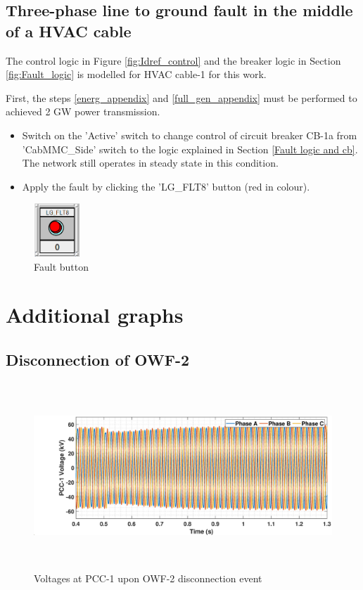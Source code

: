 \subsection{Three-phase line to ground fault in the middle of a HVAC cable}
The control logic in Figure \ref{fig:Idref_control} and the breaker logic in Section \ref{fig:Fault_logic} is modelled for \gls{HVAC} cable-1 for this work. 

First, the steps \ref{energ_appendix} and \ref{full_gen_appendix} must be performed to achieved 2 GW power transmission.

\begin{itemize}
    \item Switch on the 'Active' switch  to change control of circuit breaker CB-1a from 'CabMMC\_Side' switch to the logic explained in Section \ref{Fault logic and cb}. The network still operates in steady state in this condition.
    \item Apply the fault by clicking the 'LG\_FLT8' button (red in colour).
\end{itemize}

\begin{figure}[H]
\centering
    \includegraphics[height = 2cm,width = 1.75cm]{Diagrams/Appendix_C/Fault_button.PNG}
    \caption{Fault button}
    \label{fig:Fault_button}
\end{figure}

\section{Additional graphs}
\subsection{Disconnection of OWF-2}

\begin{figure}[H]
    \includegraphics[height = 7cm,width = \textwidth]{Diagrams/Appendix_C/VABC_WT1_WT2off.eps}
    \caption{Voltages at PCC-1 upon OWF-2 disconnection event}
    \label{VABC_WT1_WT2off}
\end{figure}

